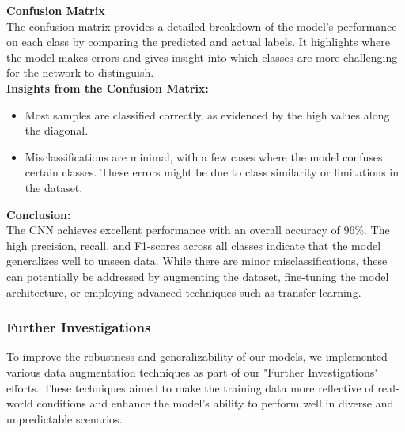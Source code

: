 \documentclass{modeleRapport}
\begin{document}
\textbf{Confusion Matrix}\\

The confusion matrix provides a detailed breakdown of the model's performance on each class by comparing the predicted and 
actual labels. It highlights where the model makes errors and gives insight into which classes are more challenging for the 
network to distinguish.\\

\textbf{Insights from the Confusion Matrix:}\\
\begin{itemize}
    \item Most samples are classified correctly, as evidenced by the high values along the diagonal.
    \item Misclassifications are minimal, with a few cases where the model confuses certain classes. 
    These errors might be due to class similarity or limitations in the dataset.\\
\end{itemize}

\textbf{Conclusion:}\\

The CNN achieves excellent performance with an overall accuracy of 96\%. The high precision, recall, 
and F1-scores across all classes indicate that the model generalizes well to unseen data. While there are minor 
misclassifications, these can potentially be addressed by augmenting the dataset, fine-tuning the model architecture, 
or employing advanced techniques such as transfer learning.

\newpage

\subsubsection{Further Investigations}

To improve the robustness and generalizability of our models, we implemented various data augmentation techniques as 
part of our "Further Investigations" efforts. These techniques aimed to make the training data more reflective of 
real-world conditions and enhance the model's ability to perform well in diverse and unpredictable scenarios.\\
\end{document}
